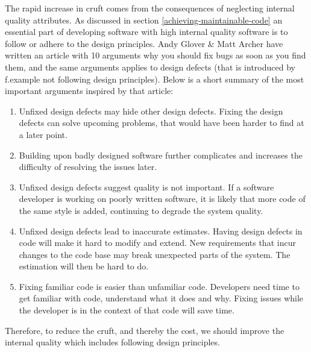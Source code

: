 \documentclass{report}
\begin{document}
The rapid increase in cruft comes from the consequences of neglecting internal quality attributes. As discussed in section \ref{achieving-maintainable-code} an essential part of developing software with high internal quality software is to follow or adhere to the design principles. Andy Glover \& Matt Archer have written an article with 10 arguments why you should fix bugs as soon as you find them\cite{10reasons}, and the same arguments applies to design defects (that is introduced by f.example not following design principles). Below is a short summary of the most important arguments inspired by that article:

\begin{enumerate}
    \item Unfixed design defects may hide other design defects. Fixing the design defects can solve upcoming problems, that would have been harder to find at a later point.
    \item Building upon badly designed software further complicates and increases the difficulty of resolving the issues later.
  
    \item Unfixed design defects suggest quality is not important. If a software developer is working on poorly written software, it is likely that more code of the same style is added, continuing to degrade the system quality.
   
    \item Unfixed design defects lead to inaccurate estimates. Having design defects in code will make it hard to modify and extend. New requirements that incur changes to the code base may break unexpected parts of the system. The estimation will then be hard to do.
   
    \item Fixing familiar code is easier than unfamiliar code. Developers need time to get familiar with code, understand what it does and why. Fixing issues while the developer is in the context of that code will save time.
\end{enumerate}

Therefore, to reduce the cruft, and thereby the cost, we should improve the internal quality which includes following design principles.


\end{document}
